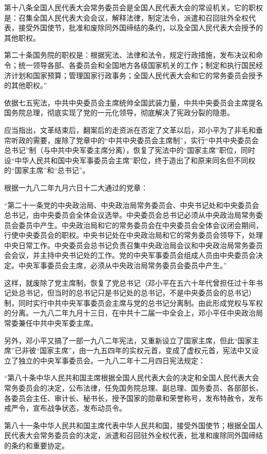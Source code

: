 \begin{maonote}
第十八条全国人民代表大会常务委员会是全国人民代表大会的常设机关。它的职权是：召集全国人民代表大会会议，解释法律，制定法令，派遣和召回驻外全权代表，接受外国使节，批准和废除同外国缔结的条约，以及全国人民代表大会授予的其他职权。

第二十条国务院的职权是：根据宪法、法律和法令，规定行政措施，发布决议和命令；统一领导各部、各委员会和全国地方各级国家机关的工作；制定和执行国民经济计划和国家预算；管理国家行政事务；全国人民代表大会和它的常务委员会授予的其他职权。”

依据七五宪法，中共中央委员会主席统帅全国武装力量，中共中央委员会主席提名国务院总理，彻底实现了党的一元化领导，彻底解决了宪政分裂的隐患。

应当指出，文革结束后，翻案后的走资派在否定了文革以后，邓小平为了非毛和垂帘听政的需要，废除了党章中的“中共中央委员会主席制”，实行“中共中央委员会总书记”制（与中共中央军委主席分离），恢复了宪法中的“国家主席”职位，同时设“中华人民共和国中央军事委员会主席”职位，终于造出了和原来同名但不同权的“国家主席”和“总书记”。

根据一九八二年九月六日十二大通过的党章：

“第二十一条党的中央政治局、中央政治局常务委员会、中央书记处和中央委员会总书记，由中央委员会全体会议选举。中央委员会总书记必须从中央政治局常务委员会委员中产生。中央政治局和它的常务委员会在中央委员会全体会议闭会期间，行使中央委员会的职权。中央书记处在中央政治局和它的常务委员会领导下，处理中央日常工作。中央委员会总书记负责召集中央政治局会议和中央政治局常务委员会会议，并主持中央书记处的工作。党的中央军事委员会组成人员由中央委员会决定。中央军事委员会主席，必须从中央政治局常务委员会委员中产生。”

这样，就废除了党主席制，恢复了党总书记（邓小平在五六十年代曾担任过十年书记处总书记，但当时的总书记只是书记处的总书记，不是中央委员会的总书记）制，同时实行中共中央军事委员会主席与党的总书记分离制。由此形成党权与军权的分离。一九八二年九月十三日，在中共十二届一中全会上，邓小平任中央政治局常委兼任中共中央军委主席。

另外，邓小平又搞了一部一九八二年宪法，又重新设立了国家主席，但此“国家主席”已非彼“国家主席”，由一九五四年的实权元首，变成了虚权元首，宪法中又设立了独立的中央军事委员会。一九八二年十二月四日宪法规定：

“第八十条中华人民共和国主席根据全国人民代表大会的决定和全国人民代表大会常务委员会的决定，公布法律，任免国务院总理、副总理、国务委员、各部部长、各委员会主任、审计长、秘书长，授予国家的勋章和荣誉称号，发布特赦令，发布戒严令，宣布战争状态，发布动员令。

第八十一条中华人民共和国主席代表中华人民共和国，接受外国使节；根据全国人民代表大会常务委员会的决定，派遣和召回驻外全权代表，批准和废除同外国缔结的条约和重要协定。


\end{maonote}

